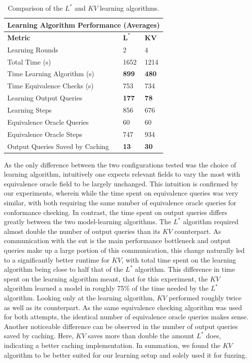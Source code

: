 \begin{table}[h]
	\centering
	\begin{tabular}{ |p{6.5cm}||p{1cm}|p{1cm}|  }
		\hline
		\multicolumn{3}{|c|}{\textbf{Learning Algorithm Performance (Averages)}} \\
		\hline
		\textbf{Metric} & $\mathbf{L^*}$ & $\mathbf{KV}$ \\
		\hline
		Learning Rounds							&	2				&	4 				\\
		Total Time (s)							&   1652			& 	1214   			\\
		Time Learning Algorithm	(s)				&	\textbf{899}	& 	\textbf{480}	\\
		Time Equivalence Checks (s)				& 	753				& 	734			\\
		Learning Output Queries 				&   \textbf{177}	& 	\textbf{78}		\\
		Learning Steps							& 	856	  			& 	676   			\\
		Equivalence Oracle Queries				& 	60  			&  	60				\\
		Equivalence Oracle Steps				& 	747  			&  	934				\\
		Output Queries Saved by Caching			& 	\textbf{13}		&  	\textbf{30}				\\
		\hline
	\end{tabular}
	\caption{Comparison of the $L^*$ and $KV$ learning algorithms.}
	\label{tab:compkvlstar}
\end{table}

As the only difference between the two configurations tested was the choice of learning algorithm, intuitively one expects relevant fields to vary the most with equivalence oracle field to be largely unchanged. This intuition is confirmed by our experiments, wherein while the time spent on equivalence queries was very similar, with both requiring the same number of equivalence oracle queries for conformance checking. In contrast, the time spent on output queries differs greatly between the two model-learning algorithms. The $L^*$ algorithm required almost double the number of output queries than its $KV$ counterpart. As communication with the \ac{sut} is the main performance bottleneck and output queries make up a large portion of this communication, this change naturally led to a significantly better runtime for $KV$, with total time spent on the learning algorithm being close to half that of the $L^*$ algorithm. This difference in time spent on the learning algorithm meant, that for this experiment, the $KV$ algorithm learned a model in roughly 75\% of the time needed by the $L^*$ algorithm. Looking only at the learning algorithm, $KV$ performed roughly twice as well as its counterpart. As the same equivalence checking algorithm was used for both attempts, the identical number of equivalence oracle queries makes sense. Another noticeable difference can be observed in the number of output queries saved by caching. Here, $KV$ saves more than double the amount $L^*$ does, indicating a better caching implementation. In summation, we found the $KV$ algorithm to be better suited for our learning setup and solely used it for fuzzing. \\\\

